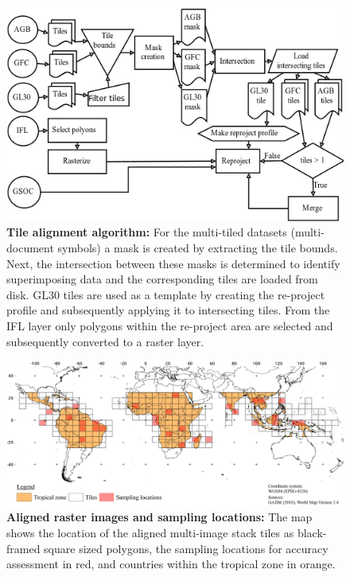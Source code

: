 		\begin{figure}[ht]
			\centering
			\includegraphics[scale=.9]{img/align}
			\caption[Tile alignment algorithm]{\textbf{Tile alignment algorithm:} For the multi-tiled datasets (multi-document symbols) a mask is created by extracting the tile bounds. Next, the intersection between these masks is determined to identify superimposing data and the corresponding tiles are loaded from disk. \ac{GL30} tiles are used as a template by creating the re-project profile and subsequently applying it to intersecting tiles. From the \ac{IFL} layer only polygons within the re-project area are selected and subsequently converted to a raster layer.}
			\label{fig:preprocessing_flowchart}
		\end{figure}
		\begin{figure}[!ht]
			\centering
			\includegraphics[scale=.95]{img/method_overview_frameless}
			\caption[Aligned raster images and sampling locations]{\textbf{Aligned raster images and sampling locations:} The map shows the location of the aligned multi-image stack tiles as black-framed square sized polygons, the sampling locations for accuracy assessment in red, and countries within the tropical zone in orange.}
			\label{fig:aligned_tiles}
		\end{figure}


